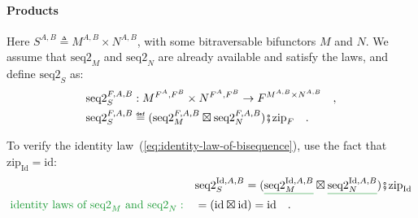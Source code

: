 \paragraph{Products}

Here $S^{A,B}\triangleq M^{A,B}\times N^{A,B}$, with some bitraversable
bifunctors $M$ and $N$. We assume that $\text{seq2}_{M}$ and $\text{seq2}_{N}$
are already available and satisfy the laws, and define $\text{seq2}_{S}$
as:
\begin{align*}
 & \text{seq2}_{S}^{F,A,B}:M^{F^{A},F^{B}}\times N^{F^{A},F^{B}}\rightarrow F^{M^{A,B}\times N^{A,B}}\quad,\\
 & \text{seq2}_{S}^{F,A,B}\triangleq(\text{seq2}_{M}^{F,A,B}\boxtimes\text{seq2}_{N}^{F,A,B})\bef\text{zip}_{F}\quad.
\end{align*}

To verify the identity law~(\ref{eq:identity-law-of-bisequence}),
use the fact that $\text{zip}_{\text{Id}}=\text{id}$:
\begin{align*}
 & \text{seq2}_{S}^{\text{Id},A,B}=(\gunderline{\text{seq2}_{M}^{\text{Id},A,B}}\boxtimes\gunderline{\text{seq2}_{N}^{\text{Id},A,B}})\bef\text{zip}_{\text{Id}}\\
{\color{greenunder}\text{identity laws of }\text{seq2}_{M}\text{ and }\text{seq2}_{N}:}\quad & =(\text{id}\boxtimes\text{id})=\text{id}\quad.
\end{align*}

